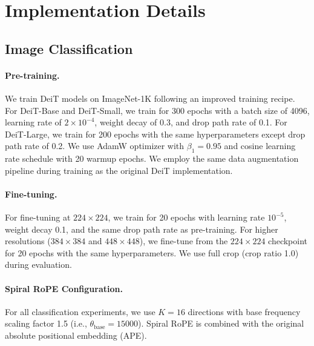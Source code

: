 
\appendix
\onecolumn

\section{Implementation Details}
\label{app:details}

\subsection{Image Classification}

\paragraph{Pre-training.} We train DeiT models on ImageNet-1K following an improved training recipe. For DeiT-Base and DeiT-Small, we train for 300 epochs with a batch size of 4096, learning rate of $2 \times 10^{-4}$, weight decay of 0.3, and drop path rate of 0.1. For DeiT-Large, we train for 200 epochs with the same hyperparameters except drop path rate of 0.2. We use AdamW optimizer with $\beta_1 = 0.95$ and cosine learning rate schedule with 20 warmup epochs. We employ the same data augmentation pipeline during training as the original DeiT implementation.

\paragraph{Fine-tuning.} For fine-tuning at $224 \times 224$, we train for 20 epochs with learning rate $10^{-5}$, weight decay 0.1, and the same drop path rate as pre-training. For higher resolutions ($384 \times 384$ and $448 \times 448$), we fine-tune from the $224 \times 224$ checkpoint for 20 epochs with the same hyperparameters. We use full crop (crop ratio 1.0) during evaluation.

\paragraph{Spiral RoPE Configuration.} For all classification experiments, we use $K=16$ directions with base frequency scaling factor 1.5 (i.e., $\theta_{\text{base}} = 15000$). Spiral RoPE is combined with the original absolute positional embedding (APE).

